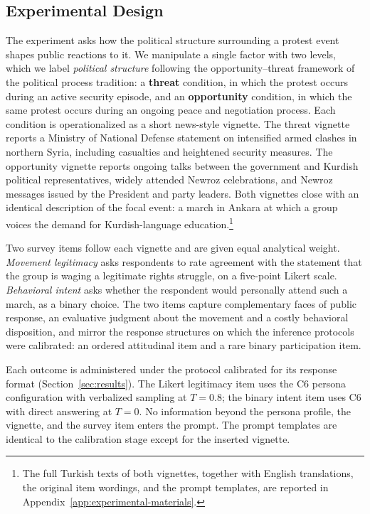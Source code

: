 \subsection{Experimental Design}
\label{sec:experimental_design}

The experiment asks how the political structure surrounding a protest event
shapes public reactions to it. We manipulate a single factor with two
levels, which we label \emph{political structure} following the
opportunity--threat framework of the political process tradition: a
\textbf{threat} condition, in which the protest occurs during an active
security episode, and an \textbf{opportunity} condition, in which the same
protest occurs during an ongoing peace and negotiation process. Each
condition is operationalized as a short news-style vignette. The threat
vignette reports a Ministry of National Defense statement on intensified
armed clashes in northern Syria, including casualties and heightened
security measures. The opportunity vignette reports ongoing talks between
the government and Kurdish political representatives, widely attended
Newroz celebrations, and Newroz messages issued by the President and party
leaders. Both vignettes close with an identical description of the focal
event: a march in Ankara at which a group voices the demand for
Kurdish-language education.\footnote{The full Turkish texts of both
vignettes, together with English translations, the original item wordings,
and the prompt templates, are reported in
Appendix~\ref{app:experimental-materials}.}

Two survey items follow each vignette and are given equal analytical
weight. \emph{Movement legitimacy} asks respondents to rate agreement with
the statement that the group is waging a legitimate rights struggle, on a
five-point Likert scale. \emph{Behavioral intent} asks whether the
respondent would personally attend such a march, as a binary choice. The
two items capture complementary faces of public response, an evaluative
judgment about the movement and a costly behavioral disposition, and mirror
the response structures on which the inference protocols were calibrated:
an ordered attitudinal item and a rare binary participation item.

Each outcome is administered under the protocol calibrated for its response
format (Section~\ref{sec:results}). %
The Likert legitimacy item uses the C6 persona configuration with
verbalized sampling at $T=0.8$; the binary intent item uses C6 with direct
answering at $T=0$. No information beyond the persona profile, the
vignette, and the survey item enters the prompt. The prompt templates are
identical to the calibration stage except for the inserted vignette.

